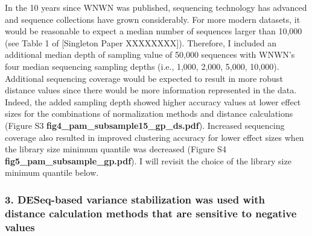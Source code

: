 \documentclass[
]{article}
\begin{document}
In the 10 years since WNWN was published, sequencing technology has
advanced and sequence collections have grown considerably. For more
modern datasets, it would be reasonable to expect a median number of
sequences larger than 10,000 (see Table 1 of {[}Singleton Paper
XXXXXXXX{]}). Therefore, I included an additional median depth of
sampling value of 50,000 sequences with WNWN's four median sequencing
sampling depths (i.e., 1,000, 2,000, 5,000, 10,000). Additional
sequencing coverage would be expected to result in more robust distance
values since there would be more information represented in the data.
Indeed, the added sampling depth showed higher accuracy values at lower
effect sizes for the combinations of normalization methods and distance
calculations (Figure S3 \textbf{fig4\_pam\_subsample15\_gp\_ds.pdf}).
Increased sequencing coverage also resulted in improved clustering
accuracy for lower effect sizes when the library size minimum quantile
was decreased (Figure S4 \textbf{fig5\_pam\_subsample\_gp.pdf}). I will
revisit the choice of the library size minimum quantile below.

\hypertarget{deseq-based-variance-stabilization-was-used-with-distance-calculation-methods-that-are-sensitive-to-negative-values}{%
\subsubsection{3. DESeq-based variance stabilization was used with
distance calculation methods that are sensitive to negative
values}\label{deseq-based-variance-stabilization-was-used-with-distance-calculation-methods-that-are-sensitive-to-negative-values}}
\end{document}

